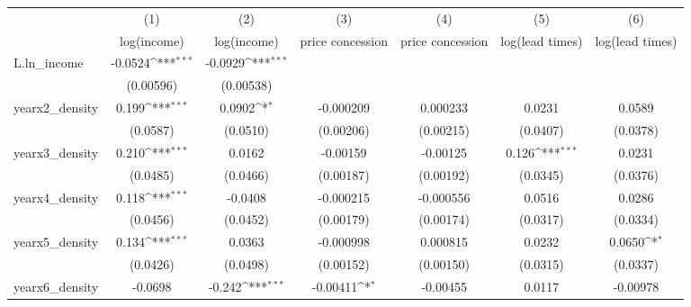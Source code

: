 {
\def\sym#1{\ifmmode^{#1}\else\(^{#1}\)\fi}
\begin{tabular}{l*{6}{c}}
\toprule
            &\multicolumn{1}{c}{(1)}&\multicolumn{1}{c}{(2)}&\multicolumn{1}{c}{(3)}&\multicolumn{1}{c}{(4)}&\multicolumn{1}{c}{(5)}&\multicolumn{1}{c}{(6)}\\
            &\multicolumn{1}{c}{log(income)}&\multicolumn{1}{c}{log(income)}&\multicolumn{1}{c}{price concession}&\multicolumn{1}{c}{price concession}&\multicolumn{1}{c}{log(lead times)}&\multicolumn{1}{c}{log(lead times)}\\
\midrule
L.ln\_income &     -0.0524\sym{***}&     -0.0929\sym{***}&                     &                     &                     &                     \\
            &   (0.00596)         &   (0.00538)         &                     &                     &                     &                     \\
\addlinespace
yearx2\_density&       0.199\sym{***}&      0.0902\sym{*}  &   -0.000209         &    0.000233         &      0.0231         &      0.0589         \\
            &    (0.0587)         &    (0.0510)         &   (0.00206)         &   (0.00215)         &    (0.0407)         &    (0.0378)         \\
\addlinespace
yearx3\_density&       0.210\sym{***}&      0.0162         &    -0.00159         &    -0.00125         &       0.126\sym{***}&      0.0231         \\
            &    (0.0485)         &    (0.0466)         &   (0.00187)         &   (0.00192)         &    (0.0345)         &    (0.0376)         \\
\addlinespace
yearx4\_density&       0.118\sym{***}&     -0.0408         &   -0.000215         &   -0.000556         &      0.0516         &      0.0286         \\
            &    (0.0456)         &    (0.0452)         &   (0.00179)         &   (0.00174)         &    (0.0317)         &    (0.0334)         \\
\addlinespace
yearx5\_density&       0.134\sym{***}&      0.0363         &   -0.000998         &    0.000815         &      0.0232         &      0.0650\sym{*}  \\
            &    (0.0426)         &    (0.0498)         &   (0.00152)         &   (0.00150)         &    (0.0315)         &    (0.0337)         \\
\addlinespace
yearx6\_density&     -0.0698         &      -0.242\sym{***}&    -0.00411\sym{*}  &    -0.00455         &      0.0117         &    -0.00978         \\

\end{tabular}}
